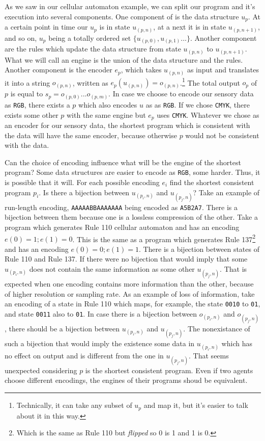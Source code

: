 \documentclass[oneside,hidelinks]{article}
\begin{document}
As we saw in our cellular automaton example, we can split our program and it's execution into several components.
One component of is the data structure $u_p$.
At a certain point in time our $u_p$ is in state $u_{(p,n)}$, at a next it is in state $u_{(p,n+1)}$, and so on, $u_{p}$ being a totally ordered set $\{u_{(p,0)},u_{(p,1)}...\}$.
Another component are the rules which update the data structure from state $u_{(p,n)}$ to $u_{(p,n+1)}$.
What we will call an engine is the union of the data structure and the rules.
Another component is the encoder $e_p$, which takes $u_{(p,n)}$ as input and translates it into a string $o_{(p,n)}$, written as $e_p(u_{(p,n)}) = o_{(p,n)}$.\footnote{Technically, it can take any subset of $u_p$ and map it, but it's easier to talk about it in this way.}
The total output $o_p$ of $p$ is equal to $s_p = o_{(p,0)}...o_{(p,m)}$.
In case we choose to encode our sensory data as \texttt{RGB}, there exists a $p$ which also encodes $u$ as as \texttt{RGB}.
If we chose \texttt{CMYK}, there exists some other $p$ with the same engine but $e_p$ uses \texttt{CMYK}.
Whatever we chose as an encoder for our sensory data, the shortest program which is consistent with the data will have the same encoder, because otherwise $p$ would not be consistent with the data.

Can the choice of encoding influence what will be the engine of the shortest program?
Some data structures are easier to encode as \texttt{RGB}, some harder.
Thus, it is possible that it will.
For each possible encoding $e_i$ find the shortest consistent program $p_i$.
Is there a bijection between $u_{(p_i,n)}$ and $u_{(p_j,n)}$?
Take an example of run-length encoding, \texttt{AAAAABBAAAAAAA} being encoded as \texttt{A5B2A7}.
There is a bijection between them because one is a lossless compression of the other.
Take a program which generates Rule 110 cellular automaton and has an encoding $e(0)=1; e(1)=0$.
This is the same as a program which generates Rule 137\footnote{Which is the same as Rule 110 but \textit{flipped} so 0 is 1 and 1 is 0.} and has an encoding $e(0)=0; e(1)=1$.
There is a bijection between states of Rule 110 and Rule 137.
If there were no bijection that would imply that some $u_{(p_i,n)}$ does not contain the same information as some other $u_{(p_j,n)}$.
That is expected when one encoding contains more information than the other, because of higher resolution or sampling rate.
As an example of loss of information, take an encoding of a state in Rule 110 which maps, for example, the state \texttt{0010} to \texttt{01}, and state \texttt{0011} also to \texttt{01}.
In case there is a bijection between $o_{(p_i,n)}$ and $o_{(p_j,n)}$, there should be a bijection between $u_{(p_i,n)}$ and $u_{(p_j,n)}$.
The nonexistance of such a bijection that would imply the existence some data in $u_{(p_i,n)}$ which has no effect on output and is different from the one in $u_{(p_j,n)}$.
That seems unexpected considering $p$ is the shortest consistent program.
Even if two agents choose different encodings, the engines of their programs shoud be equivalent.
\end{document}
